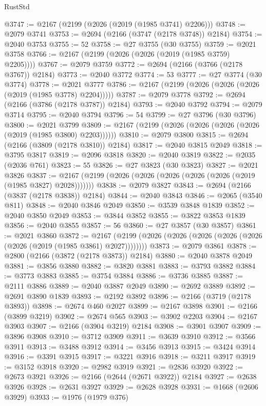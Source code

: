 \begin{lexlean}{RustStd}
\begin{coremodule}
@3747 := @2167 (@2199 (@2026 (@2019 (@1985 @3741) @2206)))
@3748 := @2079 @3741
@3753 := @2694 (@2166 (@3747 (@2178 @3748)) @2184)
@3754 := @2040 @3753
@3755 := 52
@3758 := @27 @3755 (@30 @3755)
@3759 := @2021 @3758
@3766 := @2167 (@2199 (@2026 (@2026 (@2019 (@1985 @3759) @2205))))
@3767 := @2079 @3759
@3772 := @2694 (@2166 (@3766 (@2178 @3767)) @2184)
@3773 := @2040 @3772
@3774 := 53
@3777 := @27 @3774 (@30 @3774)
@3778 := @2021 @3777
@3786 := @2167 (@2199 (@2026 (@2026 (@2026 (@2019 (@1985 @3778) @2204)))))
@3787 := @2079 @3778
@3792 := @2694 (@2166 (@3786 (@2178 @3787)) @2184)
@3793 := @2040 @3792
@3794 := @2079 @3714
@3795 := @2040 @3794
@3796 := 54
@3799 := @27 @3796 (@30 @3796)
@3800 := @2021 @3799
@3809 := @2167 (@2199 (@2026 (@2026 (@2026 (@2026 (@2019 (@1985 @3800) @2203))))))
@3810 := @2079 @3800
@3815 := @2694 (@2166 (@3809 (@2178 @3810)) @2184)
@3817 := @2040 @3815 @2049
@3818 := @3795 @3817
@3819 := @2096 @3818
@3820 := @2040 @3819
@3822 := @2035 (@2036 @761)
@3823 := 55
@3826 := @27 @3823 (@30 @3823)
@3827 := @2021 @3826
@3837 := @2167 (@2199 (@2026 (@2026 (@2026 (@2026 (@2026 (@2019 (@1985 @3827) @2028)))))))
@3838 := @2079 @3827
@3843 := @2694 (@2166 (@3837 (@2178 @3838)) @2184)
@3844 := @2040 @3843
@3846 := @2065 (@3540 @811)
@3848 := @2040 @3846 @2049
@3850 := @3539 @3848 @1839
@3852 := @2040 @3850 @2049
@3853 := @3844 @3852
@3855 := @3822 @3853 @1839
@3856 := @2040 @3855
@3857 := 56
@3860 := @27 @3857 (@30 @3857)
@3861 := @2021 @3860
@3872 := @2167 (@2199 (@2026 (@2026 (@2026 (@2026 (@2026 (@2026 (@2019 (@1985 @3861) @2027))))))))
@3873 := @2079 @3861
@3878 := @2800 (@2166 (@3872 (@2178 @3873)) @2184)
@3880 := @2040 @3878 @2049
@3881 := @3856 @3880
@3882 := @3820 @3881
@3883 := @3793 @3882
@3884 := @3773 @3883
@3885 := @3754 @3884
@3886 := @3736 @3885
@3887 := @2111 @3886
@3889 := @2040 @3887 @2049
@3890 := @2692 @3889
@3892 := @2691 @3890 @1839
@3893 := @2192 @3892
@3896 := @2166 (@3719 (@2178 @3893))
@3898 := @2674 @460 @2027
@3899 := @2167 @3898
@3901 := @2166 (@3899 @3219)
@3902 := @2674 @565
@3903 := @3902 @2203
@3904 := @2167 @3903
@3907 := @2166 (@3904 @3219) @2184
@3908 := @3901 @3907
@3909 := @3896 @3908
@3910 := @3712 @3909
@3911 := @3639 @3910
@3912 := @3566 @3911
@3913 := @3488 @3912
@3914 := @3456 @3913
@3915 := @3424 @3914
@3916 := @3391 @3915
@3917 := @3221 @3916
@3918 := @3211 @3917
@3919 := @3152 @3918
@3920 := @2982 @3919
@3921 := @2836 @3920
@3922 := @2673 @3921
@3926 := @2166 (@2644 (@2671 @3922)) @2184
@3927 := @2638 @3926
@3928 := @2631 @3927
@3929 := @2628 @3928
@3931 := @1668 (@2606 @3929)
@3933 := @1976 (@1979 @376)

\end{coremodule}
\end{lexlean}
